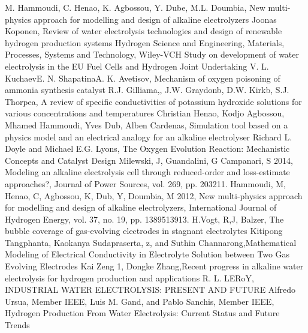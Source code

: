 \singlespacing
\begin{thebibliography}{99}
\linespread{1} 
M. Hammoudi, C. Henao, K. Agbossou, Y. Dube, M.L. Doumbia, New multi-physics approach for modelling and design of alkaline electrolyzers
Joonas Koponen, Review of water electrolysis technologies and design of renewable hydrogen production systems
Hydrogen Science and Engineering, Materials, Processes, Systems and Technology, Wiley-VCH
Study on development of water electrolysis in the EU Fuel Cells and Hydrogen Joint Undertaking
V. L. KuchaevE. N. ShapatinaA. K. Avetisov, Mechanism of oxygen poisoning of ammonia synthesis catalyst
R.J. Gilliama,, J.W. Graydonb, D.W. Kirkb, S.J. Thorpea, A review of specific conductivities of potassium hydroxide solutions for various concentrations and temperatures
Christian Henao, Kodjo Agbossou, Mhamed Hammoudi, Yves Dub, Alben Cardenas, Simulation tool based on a physics model and an electrical analogy for an alkaline electrolyser
Richard L. Doyle and Michael E.G. Lyons, The Oxygen Evolution Reaction: Mechanistic Concepts and Catalyst Design
Milewski, J, Guandalini, G  Campanari, S 2014, Modeling an alkaline electrolysis cell through reduced-order and loss-estimate approaches?, Journal of Power Sources, vol. 269, pp. 203211.
Hammoudi, M, Henao, C, Agbossou, K, Dub, Y, Doumbia, M 2012, New multi-physics approach for modelling and design of alkaline electrolyzers, International Journal of Hydrogen Energy, vol. 37, no. 19, pp. 1389513913.
H.Vogt, R,J, Balzer, The bubble coverage of gas-evolving electrodes in stagnant electrolytes
Kitipong Tangphanta, Kaokanya Sudapraserta, z, and Suthin Channarong,Mathematical Modeling of Electrical Conductivity
in Electrolyte Solution between Two Gas Evolving Electrodes
Kai Zeng 1, Dongke Zhang,Recent progress in alkaline water electrolysis for hydrogen production and applications
R. L. LERoY, INDUSTRIAL WATER ELECTROLYSIS: PRESENT AND FUTURE
Alfredo Ursua, Member IEEE, Luis M. Gand, and Pablo Sanchis, Member IEEE, Hydrogen Production From
Water Electrolysis: Current Status and Future Trends

\end{thebibliography}
